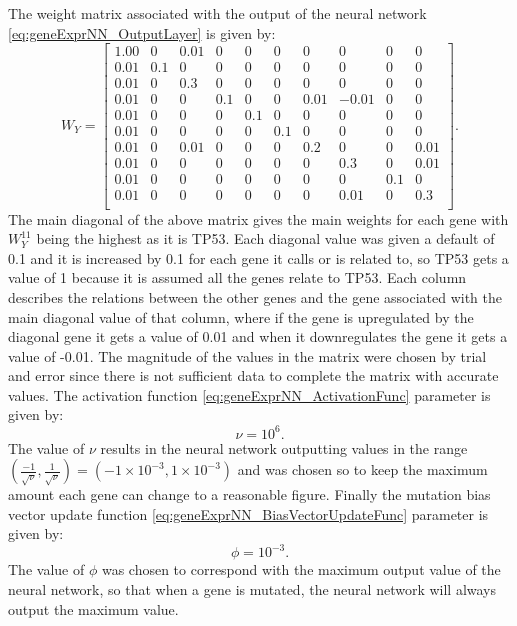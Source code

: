 \documentclass[\main/thesis.tex]{subfiles}
\begin{document}
The weight matrix associated with the output of the neural network \eqref{eq:geneExprNN_OutputLayer} is given by:
\begin{equation}
W_Y {=}
\begin{bmatrix}
	1.00 & 0 & 0.01 & 0 & 0 & 0 & 0 & 0 & 0 & 0 \\
	0.01 & 0.1 & 0 & 0 & 0 & 0 & 0 & 0 & 0 & 0 \\
	0.01 & 0 & 0.3 & 0 & 0 & 0 & 0 & 0 & 0 & 0 \\
	0.01 & 0 & 0 & 0.1 & 0 & 0 & 0.01 & \minus 0.01 & 0 & 0 \\
	0.01 & 0 & 0 & 0 & 0.1 & 0 & 0 & 0 & 0 & 0 \\
	0.01 & 0 & 0 & 0 & 0 & 0.1 & 0 & 0 & 0 & 0 \\
	0.01 & 0 & 0.01 & 0 & 0 & 0 & 0.2 & 0 & 0 & 0.01 \\
	0.01 & 0 & 0 & 0 & 0 & 0 & 0 & 0.3 & 0 & 0.01 \\
	0.01 & 0 & 0 & 0 & 0 & 0 & 0 & 0 & 0.1 & 0 \\
	0.01 & 0 & 0 & 0 & 0 & 0 & 0 & 0.01 & 0 & 0.3 \\
\end{bmatrix}.
\label{param:Wy}
\end{equation}
The main diagonal of the above matrix gives the main weights for each gene with $W_Y^{11}$ being the highest as it is TP53. Each diagonal value was given a default of 0.1 and it is increased by 0.1 for each gene it calls or is related to, so TP53 gets a value of 1 because it is assumed all the genes relate to TP53. Each column describes the relations between the other genes and the gene associated with the main diagonal value of that column, where if the gene is upregulated by the diagonal gene it gets a value of 0.01 and when it downregulates the gene it gets a value of -0.01. The magnitude of the values in the matrix were chosen by trial and error since there is not sufficient data to complete the matrix with accurate values. 
The activation function \eqref{eq:geneExprNN_ActivationFunc} parameter is given by:
\begin{equation}
\nu {=} 10^6.
\label{param:ActivationFunction}
\end{equation}
The value of $\nu$ results in the neural network outputting values in the range $(\frac{\minus 1}{\sqrt{\nu}}, \frac{1}{\sqrt{\nu}}) = (\minus 1{\times}10^{\minus 3}, 1{\times}10^{\minus 3})$ and was chosen so to keep the maximum amount each gene can change to a reasonable figure.
Finally the mutation bias vector update function \eqref{eq:geneExprNN_BiasVectorUpdateFunc} parameter is given by:
\begin{equation}
\phi = 10^{\minus 3}.
\label{param:MutationBias}
\end{equation}
The value of $\phi$ was chosen to correspond with the maximum output value of the neural network, so that when a gene is mutated, the neural network will always output the maximum value.
\end{document}
